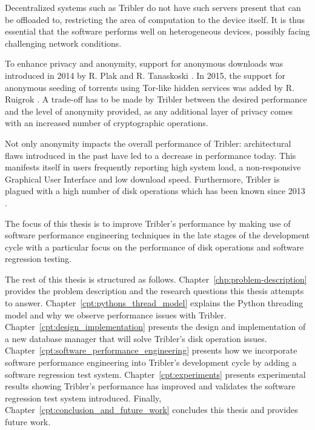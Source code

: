 Decentralized systems such as Tribler do not have such servers present that can be offloaded to, restricting the area of computation to the device itself.
It is thus essential that the software performs well on heterogeneous devices, possibly facing challenging network conditions.

To enhance privacy and anonymity, support for anonymous downloads was introduced in 2014 by R. Plak \cite{plak2014anonymous} and R. Tanaskoski \cite{tanaskoski2014anonymous}.
In 2015, the support for anonymous seeding of torrents using Tor-like hidden services was added by R. Ruigrok \cite{ruigrok2015bittorrent}.
A trade-off has to be made by Tribler between the desired performance and the level of anonymity provided, as any additional layer of privacy comes with an increased number of cryptographic operations.

Not only anonymity impacts the overall performance of Tribler: architectural flaws introduced in the past have led to a decrease in performance today.
This manifests itself in users frequently reporting high system load, a non-responsive Graphical User Interface and low download speed.
Furthermore, Tribler is plagued with a high number of disk operations which has been known since 2013 \cite{pouwelse2014reduce}. 

The focus of this thesis is to improve Tribler's performance by making use of software performance engineering techniques in the late stages of the development cycle with a particular focus on the performance of disk operations and software regression testing.

The rest of this thesis is structured as follows.
Chapter~\ref{chp:problem-description} provides the problem description and the research questions this thesis attempts to answer.
Chapter~\ref{cpt:pythons_thread_model} explains the Python threading model and why we observe performance issues with Tribler.
Chapter~\ref{cpt:design_implementation} presents the design and implementation of a new database manager that will solve Tribler's disk operation issues.
Chapter~\ref{cpt:software_performance_engineering} presents how we incorporate software performance engineering into Tribler's development cycle by adding a software regression test system.
Chapter~\ref{cpt:experiments} presents experimental results showing Tribler's performance has improved and validates the software regression test system introduced.
Finally, Chapter~\ref{cpt:conclusion_and_future_work} concludes this thesis and provides future work.
